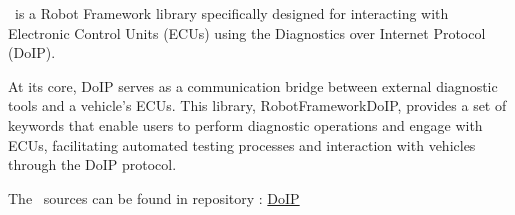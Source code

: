 %



%


\pkg\ is a Robot Framework library specifically designed for interacting with Electronic Control Units (ECUs) using the Diagnostics over Internet Protocol (DoIP).

At its core, DoIP serves as a communication bridge between external diagnostic tools and a vehicle's ECUs. This library, RobotFrameworkDoIP, 
provides a set of keywords that enable users to perform diagnostic operations and engage with ECUs, facilitating automated testing processes and interaction with vehicles through the DoIP protocol.

The \pkg\ sources can be found in repository \repo:
\href{https://github.com/test-fullautomation/robotframework-doip}{DoIP}

